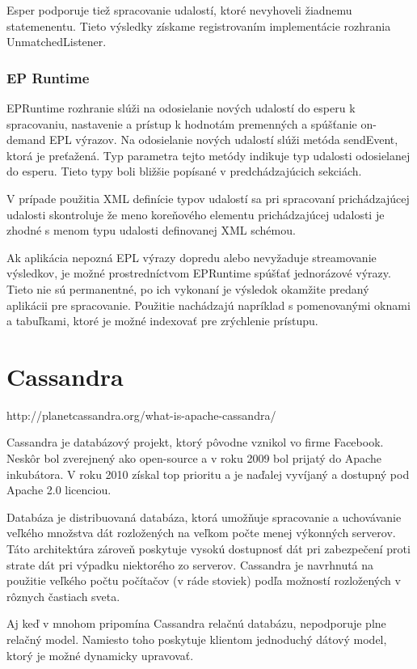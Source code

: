 		Esper podporuje tiež spracovanie udalostí, ktoré nevyhoveli žiadnemu statemenentu. Tieto výsledky získame registrovaním implementácie rozhrania UnmatchedListener. 
		
		\subsubsection{EP Runtime}
		EPRuntime rozhranie slúži na odosielanie nových udalostí do esperu k spracovaniu, nastavenie a prístup k hodnotám premenných a spúšťanie on-demand EPL výrazov. Na odosielanie nových udalostí slúži metóda sendEvent, ktorá je preťažená. Typ parametra tejto metódy indikuje typ udalosti odosielanej do esperu. Tieto typy boli bližšie popísané v predchádzajúcich sekciách.
		
		V prípade použitia XML definície typov udalostí sa pri spracovaní prichádzajúcej udalosti skontroluje že meno koreňového elementu prichádzajúcej udalosti je zhodné s menom typu udalosti definovanej XML schémou.
		
		Ak aplikácia nepozná EPL výrazy dopredu alebo nevyžaduje streamovanie výsledkov, je možné prostredníctvom EPRuntime spúšťať jednorázové výrazy. Tieto nie sú permanentné, po ich vykonaní je výsledok okamžite predaný aplikácii pre spracovanie. Použitie nachádzajú napríklad s pomenovanými oknami a tabuľkami, ktoré je možné indexovať pre zrýchlenie prístupu.		

\section{Cassandra}
	http://planetcassandra.org/what-is-apache-cassandra/
	
	Cassandra je databázový projekt, ktorý pôvodne vznikol vo firme Facebook. Neskôr bol zverejnený ako open-source a v roku 2009 bol prijatý do Apache inkubátora. V roku 2010 získal top prioritu a je naďalej vyvíjaný a dostupný pod Apache 2.0 licenciou.
	
	Databáza je distribuovaná databáza, ktorá umožňuje spracovanie a uchovávanie veľkého množstva dát rozložených na veľkom počte menej výkonných serverov. Táto architektúra zároveň poskytuje vysokú dostupnosť dát pri zabezpečení proti strate dát pri výpadku niektorého zo serverov. Cassandra je navrhnutá na použitie veľkého počtu počítačov (v ráde stoviek) podľa možností rozložených v rôznych častiach sveta.
	
	Aj keď v mnohom pripomína Cassandra relačnú databázu, nepodporuje plne relačný model. Namiesto toho poskytuje klientom jednoduchý dátový model, ktorý je možné dynamicky upravovať.
	
